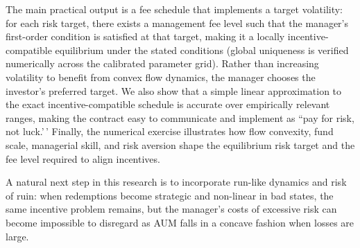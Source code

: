 The main practical output is a fee schedule that implements a target
volatility: for each risk target, there exists a management fee level
such that the manager's first-order condition is satisfied at that
target, making it a locally incentive-compatible equilibrium under the
stated conditions (global uniqueness is verified numerically across the
calibrated parameter grid). Rather than increasing volatility to benefit
from convex flow dynamics, the manager chooses the investor's preferred
target. We also show that a simple linear approximation to the exact
incentive-compatible schedule is accurate over empirically relevant
ranges, making the contract easy to communicate and implement as ``pay
for risk, not luck.'\,' Finally, the numerical exercise illustrates how
flow convexity, fund scale, managerial skill, and risk aversion shape
the equilibrium risk target and the fee level required to align
incentives.

A natural next step in this research is to incorporate run-like dynamics
and risk of ruin: when redemptions become strategic and non-linear in
bad states, the same incentive problem remains, but the manager's costs
of excessive risk can become impossible to disregard as AUM falls in a
concave fashion when losses are large.
